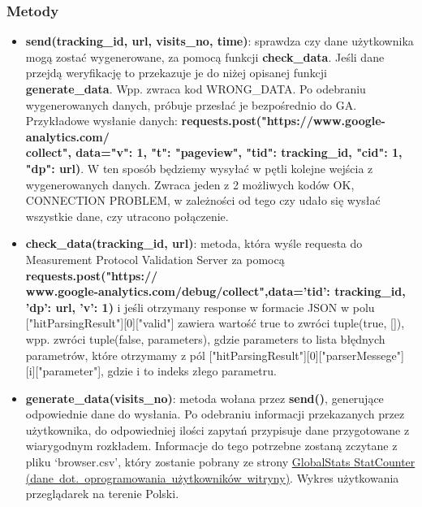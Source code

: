 \documentclass{article}
\begin{document}
\subsubsection{Metody}
\begin{itemize}
\item \textbf{send(tracking\_id, url, visits\_no, time)}: sprawdza czy dane użytkownika mogą zostać wygenerowane, za pomocą funkcji \textbf{check\_data}. Jeśli dane przejdą weryfikację to przekazuje je do niżej opisanej funkcji \textbf{generate\_data}. Wpp. zwraca kod WRONG\_DATA. Po odebraniu wygenerowanych danych, próbuje przesłać je bezpośrednio do GA\@. Przykładowe wysłanie danych: \textbf{requests.post("https://www.google-analytics.com/\\collect", data={"v":  1, "t": "pageview", "tid": tracking\_id, "cid": 1, "dp": url})}. W ten sposób będziemy wysyłać w pętli kolejne wejścia z wygenerowanych danych. Zwraca jeden z  2 możliwych kodów {OK, CONNECTION PROBLEM}, w zależności od tego czy udało się wysłać wszystkie dane, czy utracono połączenie.

\item \textbf{check\_data(tracking\_id, url)}: metoda, która wyśle requesta do Measurement Protocol Validation Server za pomocą \textbf{requests.post("https://\\www.google-analytics.com/debug/collect",data={'tid': tracking\_id, 'dp': url, 'v': 1})} i jeśli otrzymany response w formacie JSON w polu ["hitParsingResult"][0]["valid"] zawiera wartość true to zwróci tuple(true, []), wpp. zwróci tuple(false, parameters), gdzie parameters to lista błędnych parametrów, które otrzymamy z pól ["hitParsingResult"][0]["parserMessege"] [i]["parameter"], gdzie i to indeks złego parametru.

\item \textbf{generate\_data(visits\_no)}: metoda wołana przez \textbf{send()}, generujące odpowiednie dane do wysłania. Po odebraniu informacji przekazanych przez użytkownika, do odpowiedniej ilości zapytań przypisuje dane przygotowane z wiarygodnym rozkładem. Informacje do tego potrzebne zostaną zczytane z pliku `browser.csv', który zostanie pobrany ze strony \href{http://gs.statcounter.com/browser-version-market-share/all/poland#monthly-201703-201803-bar}{GlobalStats StatCounter (dane\ dot.\ oprogramowania\ użytkowników\ witryny)}. Wykres użytkowania przeglądarek na terenie Polski.


\end{itemize}
\end{document}
